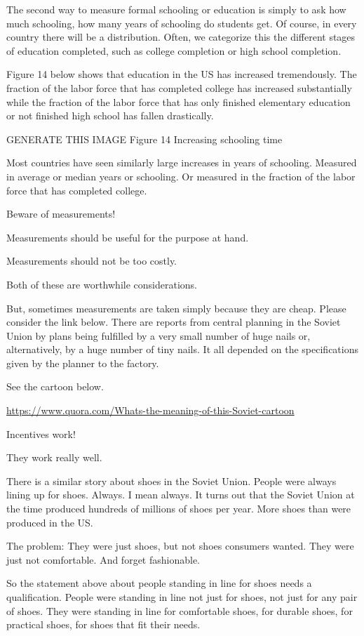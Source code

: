 \documentclass[
]{book}
\begin{document}
The second way to measure formal schooling or education is simply to ask how much schooling, how many years of schooling do students get. Of course, in every country there will be a distribution. Often, we categorize this the different stages of education completed, such as college completion or high school completion.

Figure 14 below shows that education in the US has increased tremendously. The fraction of the labor force that has completed college has increased substantially while the fraction of the labor force that has only finished elementary education or not finished high school has fallen drastically.

GENERATE THIS IMAGE
Figure 14 Increasing schooling time

Most countries have seen similarly large increases in years of schooling. Measured in average or median years or schooling. Or measured in the fraction of the labor force that has completed college.

Beware of measurements!

Measurements should be useful for the purpose at hand.

Measurements should not be too costly.

Both of these are worthwhile considerations.

But, sometimes measurements are taken simply because they are cheap. Please consider the link below. There are reports from central planning in the Soviet Union by plans being fulfilled by a very small number of huge nails or, alternatively, by a huge number of tiny nails. It all depended on the specifications given by the planner to the factory.

See the cartoon below.

\url{https://www.quora.com/Whats-the-meaning-of-this-Soviet-cartoon}

Incentives work!

They work really well.

There is a similar story about shoes in the Soviet Union. People were always lining up for shoes. Always. I mean always. It turns out that the Soviet Union at the time produced hundreds of millions of shoes per year. More shoes than were produced in the US.

The problem: They were just shoes, but not shoes consumers wanted. They were just not comfortable. And forget fashionable.

So the statement above about people standing in line for shoes needs a qualification. People were standing in line not just for shoes, not just for any pair of shoes. They were standing in line for comfortable shoes, for durable shoes, for practical shoes, for shoes that fit their needs.
\end{document}
